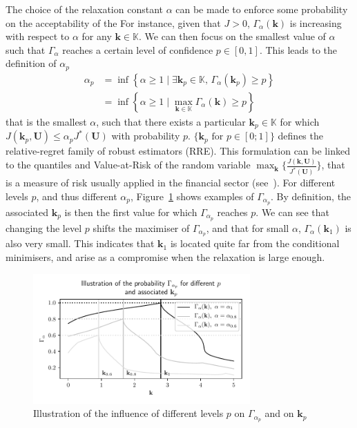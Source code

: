 \documentclass[preprint, 1p]{elsarticle}
\newcommand{\RRE}{RRE}
\newcommand{\checkap}{{\alpha}_p}
\newcommand{\checkkp}{{\mathbf{k}}_p}
\newcommand{\Kspace}{\mathbb{K}}
\begin{document}
The choice of the relaxation constant $\alpha$ can be made to enforce some probability on the acceptability of the 
For instance, given that $J>0$, $\Gamma_{\alpha}(\mathbf{k})$ is increasing with respect to $\alpha$ for any $\mathbf{k}\in\Kspace$. We can then focus on the smallest value of $\alpha$ such that $\Gamma_\alpha$ reaches a certain level of confidence $p\in[0,1]$. This leads to the definition of $\checkap$
\begin{align}
  \checkap &= \inf\left\{ \alpha\geq 1 \mid \exists \checkkp \in \Kspace,\, \Gamma_{\alpha}(\checkkp) \geq p \right\} \nonumber \\
   &= \inf \left\{ \alpha \geq 1 \mid \max_{\mathbf{k}\in\Kspace} \Gamma_{\alpha}(\mathbf{k}) \geq p \right\}   \label{eq:def_alpha_check}
\end{align}
that is the smallest $\alpha$, such that there exists a particular $\checkkp \in \Kspace$ for which $J(\checkkp,\mathbf{U}) \leq \checkap J^*(\mathbf{U})$ with probability $p$.
$\{\mathbf{k}_p \text{ for } p \in [0;1] \}$ defines the relative-regret family of robust estimators (\RRE).
This formulation can be linked to the quantiles and Value-at-Risk of the random variable $\max_{\mathbf{k}} \{ \frac{J(\mathbf{k},\mathbf{U})}{J^*(\mathbf{U})}\}$, that is a measure of risk usually applied in the financial sector (see~\cite{rockafellar_deviation_2002}). For different levels $p$, and thus different $\alpha_p$, Figure~\ref{fig:illu_alpha_p} shows examples of $\Gamma_{\alpha_p}$. By definition, the associated $\mathbf{k}_p$ is then the first value for which $\Gamma_{\alpha_p}$ reaches $p$. We can see that changing the level $p$ shifts the maximiser of $\Gamma_{\alpha_p}$, and that for small $\alpha$, $\Gamma_{\alpha}(\mathbf{k}_1)$ is also very small. This indicates that $\mathbf{k}_1$ is located quite far from the conditional minimisers, and arise as a compromise when the relaxation is large enough.

\begin{figure}[!ht]
\centering
\includegraphics[width = 8.3cm]{Figures/illu_alpha_p.pdf}
\caption{Illustration of the influence of different levels $p$ on $\Gamma_{\alpha_p}$ and on $\mathbf{k}_p$}
\label{fig:illu_alpha_p}
\end{figure}
\end{document}
